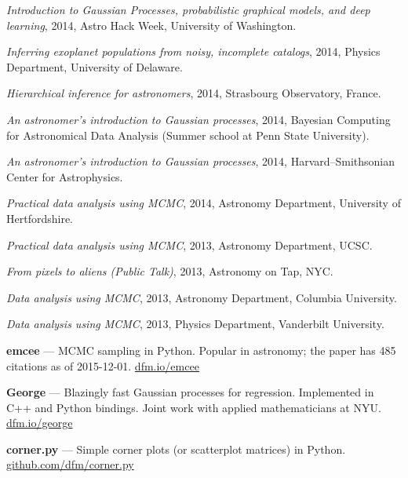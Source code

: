 \documentclass[12pt,letterpaper]{article}
\begin{document}
\begin{list}{}{\cvlist}
\item \emph{Introduction to Gaussian Processes, probabilistic graphical
            models, and deep learning},
    2014, Astro Hack Week, University of Washington.

\item \emph{Inferring exoplanet populations from noisy, incomplete catalogs},
    2014, Physics Department, University of Delaware.

\item \emph{Hierarchical inference for astronomers},
    2014, Strasbourg Observatory, France.

\item \emph{An astronomer's introduction to Gaussian processes},
    2014, Bayesian Computing for Astronomical Data Analysis (Summer school at
    Penn State University).

\item \emph{An astronomer's introduction to Gaussian processes},
    2014, Harvard--Smithsonian Center for Astrophysics.

\item \emph{Practical data analysis using MCMC},
    2014, Astronomy Department, University of Hertfordshire.

\item \emph{Practical data analysis using MCMC},
    2013, Astronomy Department, UCSC.

\item \emph{From pixels to aliens (Public Talk)},
    2013, Astronomy on Tap, NYC.

\item \emph{Data analysis using MCMC},
    2013, Astronomy Department, Columbia University.

\item \emph{Data analysis using MCMC},
    2013, Physics Department, Vanderbilt University.
\end{list}

\begin{list}{}{\cvlist}

\item {\bf emcee} ---
    MCMC sampling in Python. Popular in astronomy; the paper has 485 citations
    as of 2015-12-01. \url{dfm.io/emcee}

\item {\bf George} ---
    Blazingly fast Gaussian processes for regression. Implemented in C++ and
    Python bindings. Joint work with applied mathematicians at NYU.
    \url{dfm.io/george}

\item {\bf corner.py} ---
    Simple corner plots (or scatterplot matrices) in Python.
    \url{github.com/dfm/corner.py}

\end{list}


\end{document}
